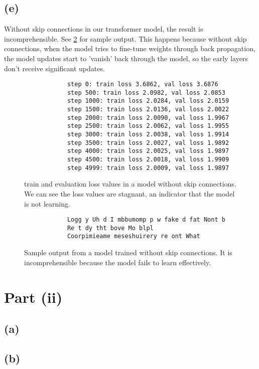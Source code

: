 \documentclass{article}  %
\begin{document}
	\subsection*{(e)}
	
	Without skip connections in our transformer model, the result is incomprehensible. See \ref{skip-example} for sample output. This happens because without skip connections, when the model tries to fine-tune weights through back propagation, the model updates start to 'vanish' back through the model, so the early layers don't receive significant updates.
	
	\begin{figure}[H]
		\begin{verbatim}
			step 0: train loss 3.6862, val loss 3.6876
			step 500: train loss 2.0982, val loss 2.0853
			step 1000: train loss 2.0284, val loss 2.0159
			step 1500: train loss 2.0136, val loss 2.0022
			step 2000: train loss 2.0090, val loss 1.9967
			step 2500: train loss 2.0062, val loss 1.9955
			step 3000: train loss 2.0038, val loss 1.9914
			step 3500: train loss 2.0027, val loss 1.9892
			step 4000: train loss 2.0025, val loss 1.9897
			step 4500: train loss 2.0018, val loss 1.9909
			step 4999: train loss 2.0009, val loss 1.9897
		\end{verbatim}
		\label{skip-loss}
		\caption{train and evaluation loss values in a model without skip connections. We can see the loss values are stagnant, an indicator that the model is not learning.}
	\end{figure}
	
	\begin{figure}[H]
		\begin{verbatim}
			Logg y Uh d I mbbumomp p w fake d fat Nont b
			Re t dy tht bove Mo blpl
			Coorpimieame meseshuirery re ont What
		\end{verbatim}
		\label{skip-example}
		\caption{Sample output from a model trained without skip connections. It is incomprehensible because the model fails to learn effectively.}
	\end{figure}
	
	\newpage
	
	\section*{Part (ii)}
	
	\subsection*{(a)}
	
	\subsection*{(b)}
	
\end{document}
